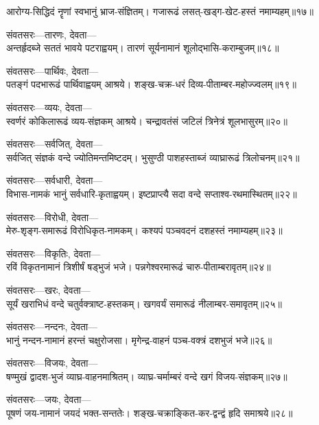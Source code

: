 आरोग्य-सिद्धिदं नॄणां स्वभानुं भ्राज-संज्ञितम्।
गजारूढं लसत्-खड्ग-खेट-हस्तं नमाम्यहम्॥१७॥

संवतसरः---तारणः, देवता---\\

अन्तर्हृदब्जे सततं भावये पटराह्वयम्।
तारणं सूर्यनामानं शूलोद्भासि-कराम्बुजम्॥१८॥

संवतसरः---पार्थिवः, देवता---\\

पतङ्गं पदभारूढं पार्थिवाह्वयम् आश्रये।
शङ्ख-चक्र-धरं दिव्य-पीताम्बर-महोज्ज्वलम्॥१९॥

संवतसरः---व्ययः, देवता---\\

स्वर्णरं कोकिलारूढं व्यय-संज्ञकम् आश्रये।
चन्द्रावतंसं जटिलं त्रिनेत्रं शूलभासुरम्॥२०॥

संवतसरः---सर्वजित्, देवता---\\

सर्वजित् संज्ञकं वन्दे ज्योतिमन्तमिष्टदम्।
भुसुण्ठी पाशहस्ताब्जं व्याघ्रारूढं त्रिलोचनम्॥२१॥

संवतसरः---सर्वधारी, देवता---\\

विभास-नामकं भानुं सर्वधारि-कृताह्वयम्।
इष्टप्राप्त्यै सदा वन्दे सप्ताश्व-रथमास्थितम्॥२२॥

संवतसरः---विरोधी, देवता---\\

मेरु-शृङ्ग-समारूढं विरोधिकृत-नामकम्।
कश्यपं पञ्चवदनं दशहस्तं नमाम्यहम्॥२३॥

संवतसरः---विकृतिः, देवता---\\

रविं विकृतनामानं त्रिशीर्षं षड्भुजं भजे।
पन्नगेश्वरमारूढं चारु-पीताम्बरावृतम्॥२४॥

संवतसरः---खरः, देवता---\\

सूर्यं खराभिधं वन्दे चतुर्वक्त्राष्ट-हस्तकम्।
खगवर्यं समारूढं नीलाम्बर-समावृतम्॥२५॥

संवतसरः---नन्दनः, देवता---\\

भानुं नन्दन-नामानं हरन्तं चक्षुरोजसा।
मृगेन्द्र-वाहनं पञ्च-वक्त्रं दशभुजं भजे॥२६॥

संवतसरः---विजयः, देवता---\\

षण्मुखं द्वादश-भुजं व्याघ्र-वाहनमाश्रितम्।
व्याघ्र-चर्माम्बरं वन्दे खगं विजय-संज्ञकम्॥२७॥

संवतसरः---जयः, देवता---\\

पूषणं जय-नामानं जयदं भक्त-सन्ततेः।
शङ्ख-चक्राङ्कित-कर-द्वन्द्वं हृदि समाश्रये॥२८॥

